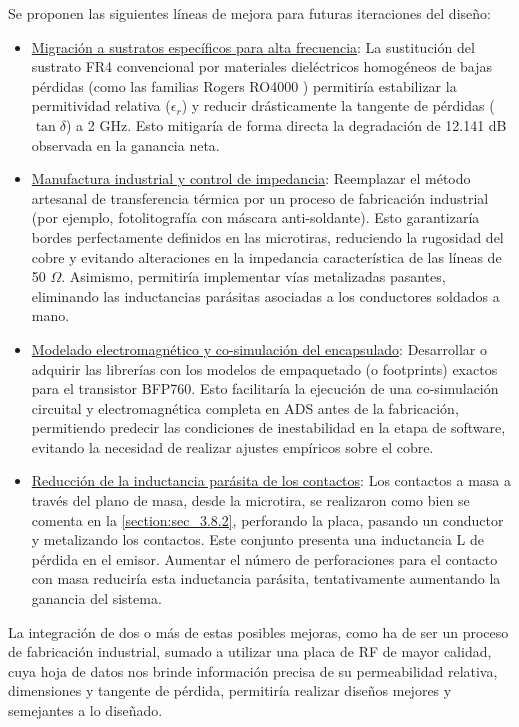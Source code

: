 \documentclass{article}
\begin{document}
Se proponen las siguientes líneas de mejora para futuras iteraciones del diseño:

\begin{itemize}
    \item \underline{Migración a sustratos específicos para alta frecuencia}: La sustitución del sustrato FR4 convencional por materiales dieléctricos homogéneos de bajas pérdidas (como las familias Rogers RO4000 \cite{Rogers}) permitiría estabilizar la permitividad relativa ($\epsilon_r$) y reducir drásticamente la tangente de pérdidas ($\tan\delta$) a 2 GHz. Esto mitigaría de forma directa la degradación de 12.141 dB observada en la ganancia neta.
    
    \item \underline{Manufactura industrial y control de impedancia}: Reemplazar el método artesanal de transferencia térmica por un proceso de fabricación industrial (por ejemplo, fotolitografía con máscara anti-soldante). Esto garantizaría bordes perfectamente definidos en las microtiras, reduciendo la rugosidad del cobre y evitando alteraciones en la impedancia característica de las líneas de 50 $\Omega$. Asimismo, permitiría implementar vías metalizadas pasantes, eliminando las inductancias parásitas asociadas a los conductores soldados a mano.
    
    \item \underline{Modelado electromagnético y co-simulación del encapsulado}: Desarrollar o adquirir las librerías con los modelos de empaquetado (o footprints) exactos para el transistor BFP760. Esto facilitaría la ejecución de una co-simulación circuital y electromagnética completa en ADS antes de la fabricación, permitiendo predecir las condiciones de inestabilidad en la etapa de software, evitando la necesidad de realizar ajustes empíricos sobre el cobre.

    \item \underline{Reducción de la inductancia parásita de los contactos}: Los contactos a masa a través del plano de masa, desde la microtira, se realizaron como bien se comenta en la \autoref{section:sec_3.8.2}, perforando la placa, pasando un conductor y metalizando los contactos. Este conjunto presenta una inductancia L de pérdida en el emisor. Aumentar el número de perforaciones para el contacto con masa reduciría esta inductancia parásita, tentativamente aumentando la ganancia del sistema. 
    
\end{itemize} 

La integración de dos o más de estas posibles mejoras, como ha de ser un proceso de fabricación industrial, sumado a utilizar una placa de RF de mayor calidad, cuya hoja de datos nos brinde información precisa de su permeabilidad relativa, dimensiones y tangente de pérdida, permitiría realizar diseños mejores y semejantes a lo diseñado. 
\newpage
\printbibliography[heading=bibintoc, title={Bibliografía}]
\end{document}
